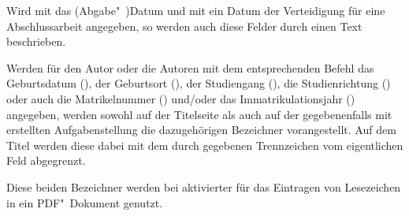 \begin{Declaration*}{}
\begin{Declaration*}{}
\begin{Declaration*}{}
\begin{Declaration}{}
\begin{Declaration}{}
\printdeclarationlist%
%
%
%
%
%
Wird mit  das (Abgabe"~)Datum und mit  ein Datum 
der Verteidigung für eine Abschlussarbeit angegeben, so werden auch diese 
Felder durch einen Text beschrieben.
%
\end{Declaration}
\end{Declaration}

\begin{Declaration}{}
\begin{Declaration}{}
\begin{Declaration}{}
\begin{Declaration}{}
\begin{Declaration}{}
\begin{Declaration}[v2.02]{}
\printdeclarationlist%
%
%
%
Werden für den Autor oder die Autoren mit dem entsprechenden Befehl das 
Geburtsdatum (), der Geburtsort (), der 
Studiengang (), die Studienrichtung () oder 
auch die Matrikelnummer () und/oder das 
Immatrikulationsjahr () angegeben, werden sowohl auf 
der Titelseite als auch auf der gegebenenfalls mit  
erstellten Aufgabenstellung die dazugehörigen Bezeichner vorangestellt. Auf 
dem Titel werden diese dabei mit dem durch  gegebenen 
Trennzeichen vom eigentlichen Feld abgegrenzt.
\end{Declaration}
\end{Declaration}
\end{Declaration}
\end{Declaration}
\end{Declaration}
\end{Declaration}

\begin{Declaration}{}
\begin{Declaration}{}
\printdeclarationlist%
%
%
Diese beiden Bezeichner werden bei aktivierter  für das 
Eintragen von Lesezeichen in ein PDF"~Dokument genutzt.
\end{Declaration}
\end{Declaration}


\end{Declaration*}
\end{Declaration*}
\end{Declaration*}
